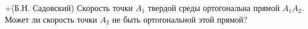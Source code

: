 +(Б.Н. Садовский)
Скорость точки $A_{1}$ твердой среды ортогональна прямой $A_{1}A_{2}$. Может ли
скорость точки $A_{2}$ не быть ортогональной этой прямой?
